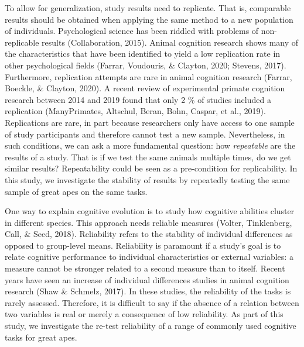 \documentclass[10pt, letterpaper]{article}
\begin{document}
To allow for generalization, study results need to replicate. That is,
comparable results should be obtained when applying the same method to a
new population of individuals. Psychological science has been riddled
with problems of non-replicable results (Collaboration, 2015). Animal
cognition research shows many of the characteristics that have been
identified to yield a low replication rate in other psychological fields
(Farrar, Voudouris, \& Clayton, 2020; Stevens, 2017). Furthermore,
replication attempts are rare in animal cognition research (Farrar,
Boeckle, \& Clayton, 2020). A recent review of experimental primate
cognition research between 2014 and 2019 found that only 2 \% of studies
included a replication (ManyPrimates, Altschul, Beran, Bohn, Caspar, et
al., 2019). Replications are rare, in part because researchers only have
access to one sample of study participants and therefore cannot test a
new sample. Nevertheless, in such conditions, we can ask a more
fundamental question: how \emph{repeatable} are the results of a study.
That is if we test the same animals multiple times, do we get similar
results? Repeatability could be seen as a pre-condition for
replicability. In this study, we investigate the stability of results by
repeatedly testing the same sample of great apes on the same tasks.

One way to explain cognitive evolution is to study how cognitive
abilities cluster in different species. This approach needs reliable
measures (Volter, Tinklenberg, Call, \& Seed, 2018). Reliability refers
to the stability of individual differences as opposed to group-level
means. Reliability is paramount if a study's goal is to relate cognitive
performance to individual characteristics or external variables: a
measure cannot be stronger related to a second measure than to itself.
Recent years have seen an increase of individual differences studies in
animal cognition research (Shaw \& Schmelz, 2017). In these studies, the
reliability of the tasks is rarely assessed. Therefore, it is difficult
to say if the absence of a relation between two variables is real or
merely a consequence of low reliability. As part of this study, we
investigate the re-test reliability of a range of commonly used
cognitive tasks for great apes.
\end{document}
